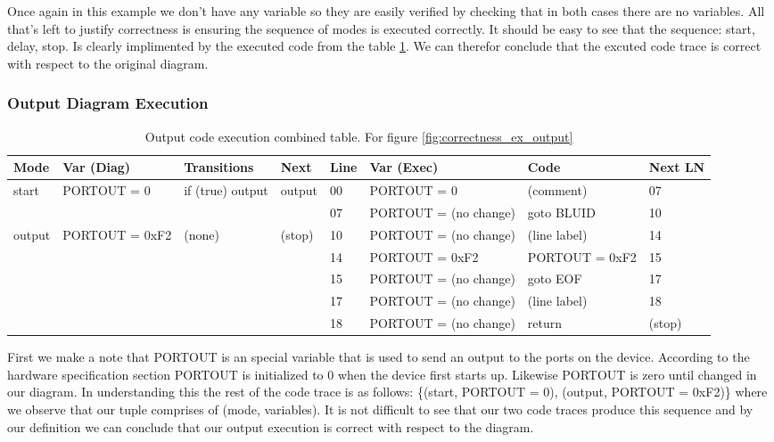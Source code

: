 Once again in this example we don't have any variable so they are easily verified by checking that in both cases
there are no variables. All that's left to justify correctness is ensuring the sequence of modes is executed correctly.
It should be easy to see that the sequence: start, delay, stop. Is clearly implimented by the executed code from the table
\ref{table:DelayExecCombined}. We can therefor conclude that the excuted code trace is correct with respect to the original
diagram.

\subsubsection{Output Diagram Execution}

\begin{table}[htcb]
	\caption{Output code execution combined table. For figure \ref{fig:correctness_ex_output}}
	\centering
	\tablefontsize
		\begin{tabular}{| p{} | p{} | p{} | p{} | p{} | p{} | p{} | p{} |}
			\hline
			\textbf{Mode} 		&	\textbf{Var (Diag)} 		& 	\textbf{Transitions} 		& 	\textbf{Next}		&	\textbf{Line}		&	\textbf{Var (Exec)	}	&	\textbf{Code}	&	\textbf{Next LN} \\
			\hline
			start 				&	PORTOUT = 0					&	if (true) output			&	output				&	00					&	PORTOUT = 0				& 	(comment)		&	07 \\
			\hline
								&								&								&						&	07					&   PORTOUT = (no change)	&	goto BLUID		&	10 \\
			\hline
			output				&	PORTOUT = 0xF2				&	(none)						&	(stop)				&	10					&	PORTOUT = (no change)	&	(line label)	&	14 \\
			\hline
								&								&								&						&	14					&	PORTOUT = 0xF2			&	PORTOUT = 0xF2	&	15 \\
			\hline
								&								&								&						&	15					&	PORTOUT = (no change)	&	goto EOF		&	17 \\
			\hline
								&								&								&						&	17					&	PORTOUT = (no change)	&	(line label)	&	18 \\
			\hline
								&								&								&						&	18					&	PORTOUT = (no change)	&	return			&	(stop) \\
			\hline
		\end{tabular}
	\label{table:DelayExecCombined}
\end{table}

First we make a note that PORTOUT is an special variable that is used to send an output to the ports on the device.
According to the hardware specification section PORTOUT is initialized to 0 when the device first starts up.
Likewise PORTOUT is zero until changed in our diagram. In understanding this the rest of the code trace is as follows:
\{(start, PORTOUT = 0), (output, PORTOUT = 0xF2)\} where we observe that our tuple comprises of (mode, variables). 
It is not difficult to see that our two code traces produce this sequence and by our definition we can conclude that our
output execution is correct with respect to the diagram.


